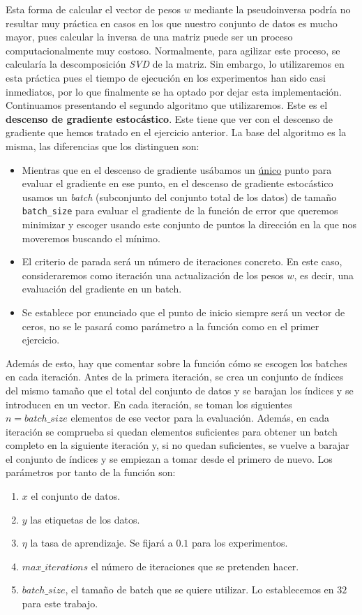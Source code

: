 \documentclass[12pt]{scrartcl}
\begin{document}
{Esta forma de calcular el vector de pesos $w$ mediante la pseudoinversa podría no resultar muy práctica en casos en los que nuestro conjunto de datos es mucho mayor, pues calcular la inversa de una matriz puede ser un proceso computacionalmente
muy costoso. Normalmente, para agilizar este proceso, se calcularía la descomposición \emph{SVD} de la matriz. 
Sin embargo, lo utilizaremos en esta práctica pues el tiempo de ejecución en los experimentos han sido casi inmediatos, por lo que finalmente se ha optado por dejar esta implementación.\\

Continuamos presentando el segundo algoritmo que utilizaremos. Este es el \textbf{descenso de gradiente estocástico}. Este tiene que ver con el descenso de gradiente que hemos tratado en el ejercicio anterior. La base del algoritmo
es la misma, las diferencias que los distinguen son:
\begin{itemize}
  \item Mientras que en el descenso de gradiente usábamos un \underline{único} punto para evaluar el gradiente en ese punto, en el descenso de gradiente estocástico usamos un \emph{batch} (subconjunto del conjunto total de los datos) de tamaño \lstinline{batch_size} para evaluar el gradiente de la función de
  error que queremos minimizar y escoger usando este conjunto de puntos la dirección en la que nos moveremos buscando el mínimo.
  \item El criterio de parada será un número de iteraciones concreto. En este caso, consideraremos como iteración una actualización de los pesos $w$, es decir, una evaluación del gradiente en un batch.
  \item Se establece por enunciado que el punto de inicio siempre será un vector de ceros, no se le pasará como parámetro a la función como en el primer ejercicio.
\end{itemize}

Además de esto, hay que comentar sobre la función cómo se escogen los batches en cada iteración. Antes de la primera iteración, se crea un conjunto de índices del mismo tamaño que el total del conjunto de datos y se barajan los índices y se introducen en un vector. En cada iteración,
se toman los siguientes $n = batch\_size$ elementos de ese vector para la evaluación. Además, en cada iteración se comprueba si quedan elementos suficientes para obtener un batch completo en la siguiente iteración y, si no quedan suficientes, se vuelve a barajar el conjunto de índices y se empiezan
a tomar desde el primero de nuevo. Los parámetros por tanto de la función son:
\begin{enumerate}
  \item $x$ el conjunto de datos.
  \item $y$ las etiquetas de los datos.
  \item $\eta$ la tasa de aprendizaje. Se fijará a $0.1$ para los experimentos.
  \item $max\_iterations$ el número de iteraciones que se pretenden hacer.
  \item $batch\_size$, el tamaño de batch que se quiere utilizar. Lo establecemos en $32$ para este trabajo.
\end{enumerate}

}
\end{document}

